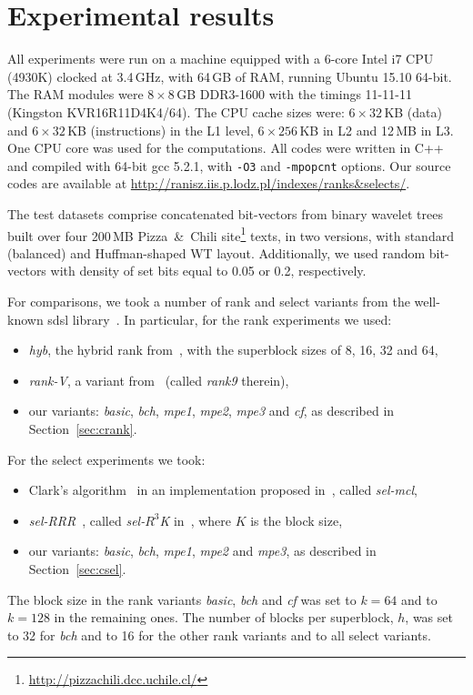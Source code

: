 \documentclass{llncs}
\begin{document}
\section{Experimental results}
\label{sec:exp}
\noindent
All experiments were run on a machine equipped with 
a 6-core Intel i7 CPU 
(4930K) 
clocked at 3.4\,GHz, with 64\,GB of RAM, 
running Ubuntu 15.10 64-bit.
The RAM modules were $8 \times 8$\,GB DDR3-1600 with the timings 
11-11-11 (Kingston KVR16R11D4K4/64).
The CPU cache sizes were: 
$6 \times 32$\,KB (data) and $6 \times 32$\,KB (instructions) in the L1 level, 
$6 \times 256$\,KB in L2 
and 12\,MB in L3.
One CPU core was used for the computations.
All codes were written in C++ and compiled with 64-bit gcc 5.2.1,
with \texttt{-O3} and \texttt{-mpopcnt} options.
Our source codes 
are available at
\url{http://ranisz.iis.p.lodz.pl/indexes/ranks&selects/}.

The test datasets comprise concatenated bit-vectors from 
binary wavelet trees built over four 200\,MB Pizza~\&~Chili 
site\footnote{\url{http://pizzachili.dcc.uchile.cl/}} texts, 
in two versions, with standard (balanced) and Huffman-shaped WT layout.
Additionally, we used random bit-vectors with density of set bits 
equal to 0.05 or 0.2, respectively.


For comparisons, we took a number of rank and select variants
from the well-known sdsl library~\cite{gbmp2014sea}.
In particular, for the rank experiments we used:
\begin{itemize}
\item {\em hyb}, the hybrid rank from~\cite{KKP14}, with the 
superblock sizes of 8, 16, 32 and 64,
\item {\em rank-V}, a variant from~\cite{V08} (called {\em rank9} therein),
\item our variants: {\em basic}, {\em bch}, {\em mpe1}, {\em mpe2}, {\em mpe3} 
and {\em cf}, as described in Section~\ref{sec:crank}.
\end{itemize}
For the select experiments we took:
\begin{itemize}
\item Clark's algorithm~\cite{Clark1996} in an implementation 
proposed in~\cite{GP13}, called {\em sel-mcl}, 
\item {\em sel-RRR}~\cite{NPsea12}, called {\em sel-$R^3$K} in~\cite{GP13}, 
where $K$ is the block size, 
\item our variants: {\em basic}, {\em bch}, {\em mpe1}, {\em mpe2} and {\em mpe3}, 
as described in Section~\ref{sec:csel}.
\end{itemize}
The block size in the rank variants {\em basic}, {\em bch} and {\em cf}
was set to $k = 64$ and to $k = 128$ in the remaining ones.
The number of blocks per superblock, $h$, was set to 32 for {\em bch} 
and to 16 for the other rank variants and to all select variants.
\end{document}

